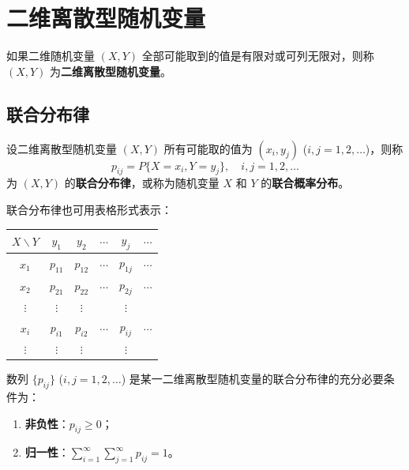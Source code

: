 \documentclass[lang=cn,11pt]{elegantbook}
\begin{document}
\section{二维离散型随机变量}

\begin{definition}[二维离散型随机变量] \label{def:2d-discrete}
如果二维随机变量 $(X,Y)$ 全部可能取到的值是有限对或可列无限对，则称 $(X,Y)$ 为\textbf{二维离散型随机变量}。
\end{definition}

\subsection{联合分布律}

\begin{definition}[联合分布律]  \label{def:joint-pm}
设二维离散型随机变量 $(X,Y)$ 所有可能取的值为 $(x_i, y_j)$ ($i,j = 1,2,\dots$)，则称
\[
p_{ij} = P\{X = x_i, Y = y_j\}, \quad i,j = 1,2,\dots
\]
为 $(X,Y)$ 的\textbf{联合分布律}，或称为随机变量 $X$ 和 $Y$ 的\textbf{联合概率分布}。
\end{definition}

联合分布律也可用表格形式表示：

\begin{center}
\begin{tabular}{c|cccc|c}
\toprule
$X \backslash Y$ & $y_1$ & $y_2$ & $\cdots$ & $y_j$ & $\cdots$ \\
\midrule
$x_1$ & $p_{11}$ & $p_{12}$ & $\cdots$ & $p_{1j}$ & $\cdots$ \\
$x_2$ & $p_{21}$ & $p_{22}$ & $\cdots$ & $p_{2j}$ & $\cdots$ \\
$\vdots$ & $\vdots$ & $\vdots$ & & $\vdots$ & \\
$x_i$ & $p_{i1}$ & $p_{i2}$ & $\cdots$ & $p_{ij}$ & $\cdots$ \\
$\vdots$ & $\vdots$ & $\vdots$ & & $\vdots$ & \\
\bottomrule
\end{tabular}
\end{center}

\begin{property}\label{prop:joint-pm-condition}
数列 $\{p_{ij}\}$ ($i,j = 1,2,\dots$) 是某一二维离散型随机变量的联合分布律的充分必要条件为：
\begin{enumerate}
    \item \textbf{非负性}：$p_{ij} \geqslant 0$；
    \item \textbf{归一性}：$\displaystyle\sum_{i=1}^{\infty}\sum_{j=1}^{\infty}p_{ij} = 1$。
\end{enumerate}
\end{property}
\end{document}

